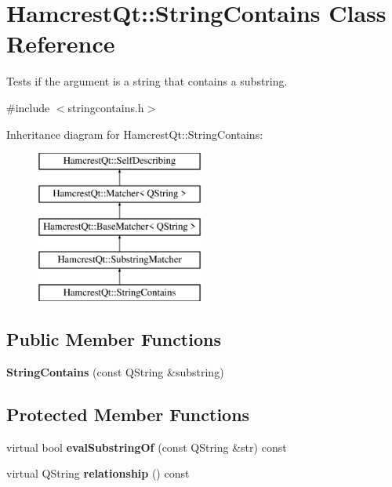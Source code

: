 \hypertarget{class_hamcrest_qt_1_1_string_contains}{\section{Hamcrest\-Qt\-:\-:String\-Contains Class Reference}
\label{class_hamcrest_qt_1_1_string_contains}
}


Tests if the argument is a string that contains a substring.  




{\ttfamily \#include $<$stringcontains.\-h$>$}

Inheritance diagram for Hamcrest\-Qt\-:\-:String\-Contains\-:\begin{figure}[H]
\begin{center}
\leavevmode
\includegraphics[height=5.000000cm]{class_hamcrest_qt_1_1_string_contains}
\end{center}
\end{figure}
\subsection*{Public Member Functions}
\begin{DoxyCompactItemize}
\item 
\hypertarget{class_hamcrest_qt_1_1_string_contains_a95fb26986696b078679b543c7cebf778}{{\bfseries String\-Contains} (const Q\-String \&substring)}\label{class_hamcrest_qt_1_1_string_contains_a95fb26986696b078679b543c7cebf778}

\end{DoxyCompactItemize}
\subsection*{Protected Member Functions}
\begin{DoxyCompactItemize}
\item 
\hypertarget{class_hamcrest_qt_1_1_string_contains_ae799a4bc7a53fa9bb2cbcd9ed516710b}{virtual bool {\bfseries eval\-Substring\-Of} (const Q\-String \&str) const }\label{class_hamcrest_qt_1_1_string_contains_ae799a4bc7a53fa9bb2cbcd9ed516710b}

\item 
\hypertarget{class_hamcrest_qt_1_1_string_contains_a69c4bb24421ea1c010d9d053315218fa}{virtual Q\-String {\bfseries relationship} () const }\label{class_hamcrest_qt_1_1_string_contains_a69c4bb24421ea1c010d9d053315218fa}

\end{DoxyCompactItemize}
